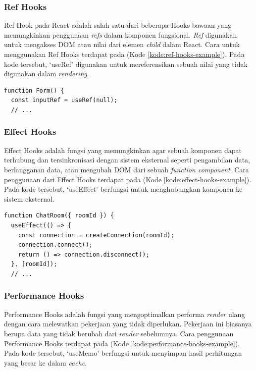 \subsubsection{Ref Hooks}
\label{subsubsec:ref-hooks}
Ref Hook pada React adalah salah satu dari beberapa Hooks bawaan yang memungkinkan penggunaan \textit{refs} dalam komponen fungsional. \textit{Ref} digunakan untuk mengakses DOM atau nilai dari elemen \textit{child} dalam React. Cara untuk menggunakan Ref Hooks terdapat pada (Kode \ref{kode:ref-hooks-example}). Pada kode tersebut, `useRef' digunakan untuk mereferensikan sebuah nilai yang tidak digunakan dalam \textit{rendering}.
\begin{lstlisting}[language=HTML, caption=Contoh Potongan Kode Ref Hooks, label=kode:ref-hooks-example]
function Form() {
  const inputRef = useRef(null);
  // ...
\end{lstlisting}

\subsubsection{Effect Hooks}
\label{subsubsec:effect-hooks}
Effect Hooks adalah fungsi yang memungkinkan agar sebuah komponen dapat terhubung dan tersinkronisasi dengan sistem eksternal seperti pengambilan data, berlangganan data, atau mengubah DOM dari sebuah \textit{function component}. Cara penggunaan dari Effect Hooks terdapat pada (Kode \ref{kode:effect-hooks-example}). Pada kode tersebut, `useEffect' berfungsi untuk menghubungkan komponen ke sistem eksternal.

\begin{lstlisting}[language=HTML, caption=Contoh Potongan Kode Effect Hooks, label=kode:effect-hooks-example]
function ChatRoom({ roomId }) {
  useEffect(() => {
    const connection = createConnection(roomId);
    connection.connect();
    return () => connection.disconnect();
  }, [roomId]);
  // ...
\end{lstlisting}

\subsubsection{Performance Hooks}
\label{subsubsec:perf-hooks}
Performance Hooks adalah fungsi yang mengoptimalkan performa \textit{render} ulang dengan cara melewatkan pekerjaan yang tidak diperlukan. Pekerjaan ini biasanya berupa data yang tidak berubah dari \textit{render} sebelumnya. Cara penggunaan Performance Hooks terdapat pada (Kode \ref{kode:performance-hooks-example}). Pada kode tersebut, `useMemo' berfungsi untuk menyimpan hasil perhitungan yang besar ke dalam \textit{cache}.


